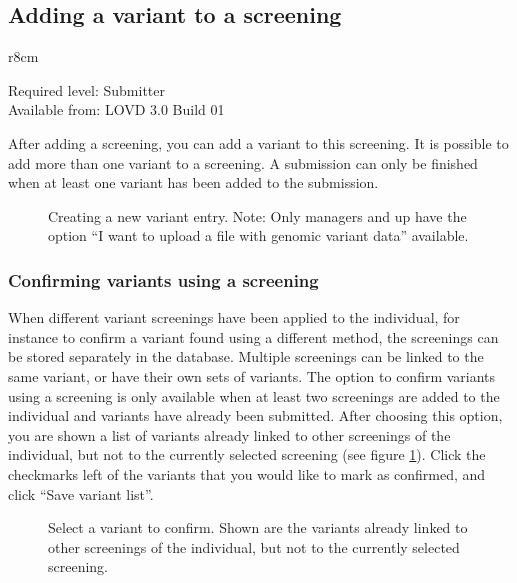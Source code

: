 \subsection{Adding a variant to a screening}
\label{ssec:add_variant_to_a_screening}
\begin{wrapfigure}[3]{r}{8cm} %
  \vspace{-25pt}
  \begin{leftbar}
    Required level: Submitter\\
    Available from: LOVD 3.0 Build 01
  \end{leftbar}
\end{wrapfigure}
After adding a screening, you can add a variant to this screening.
It is possible to add more than one variant to a screening.
A submission can only be finished when at least one variant has been added to the submission.
\begin{figure}[ht]
  \begin{shaded}
  \caption{%
    Creating a new variant entry.
    Note: Only managers and up have the option ``I want to upload a file with genomic variant data'' available.}
  \end{shaded}
\end{figure}

\subsubsection{Confirming variants using a screening}
When different variant screenings have been applied to the individual, for instance to confirm
 a variant found using a different method, the screenings can be stored separately in the database.
Multiple screenings can be linked to the same variant, or have their own sets of variants.
The option to confirm variants using a screening is only available when at least two
 screenings are added to the individual and variants have already been submitted.
After choosing this option, you are shown a list of variants already linked to other screenings
 of the individual, but not to the currently selected screening (see figure \ref{fig:confirm_variants}).
Click the checkmarks left of the variants that you would like to mark as confirmed, and click ``Save variant
 list''.

\begin{figure}[ht]
  \begin{shaded}
  \caption{%
    Select a variant to confirm.
    Shown are the variants already linked to other screenings of the individual,
     but not to the currently selected screening.}
    \label{fig:confirm_variants}
  \end{shaded}
\end{figure}

